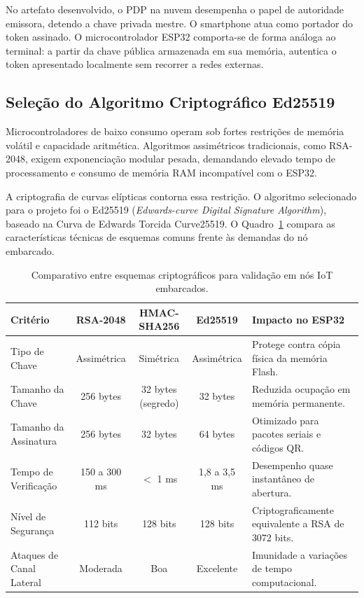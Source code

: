 No artefato desenvolvido, o PDP na nuvem desempenha o papel de autoridade emissora, detendo a chave privada mestre. O smartphone atua como portador do token assinado. O microcontrolador ESP32 comporta-se de forma análoga ao terminal: a partir da chave pública armazenada em sua memória, autentica o token apresentado localmente sem recorrer a redes externas.

\subsection{Seleção do Algoritmo Criptográfico Ed25519}
\label{subsec:escolha-ed25519}

Microcontroladores de baixo consumo operam sob fortes restrições de memória volátil e capacidade aritmética. Algoritmos assimétricos tradicionais, como RSA-2048, exigem exponenciação modular pesada, demandando elevado tempo de processamento e consumo de memória RAM incompatível com o ESP32.

A criptografia de curvas elípticas contorna essa restrição. O algoritmo selecionado para o projeto foi o Ed25519 (\textit{Edwards-curve Digital Signature Algorithm}), baseado na Curva de Edwards Torcida Curve25519. O Quadro~\ref{quadro:comparativo-cripto} compara as características técnicas de esquemas comuns frente às demandas do nó embarcado.

\begin{table}[htbp]
\centering
\footnotesize
\caption{Comparativo entre esquemas criptográficos para validação em nós IoT embarcados.}
\label{quadro:comparativo-cripto}
\begin{tabularx}{\textwidth}{p{3.2cm} ccc X}
\toprule
\textbf{Critério} & \textbf{RSA-2048} & \textbf{HMAC-SHA256} & \textbf{Ed25519} & \textbf{Impacto no ESP32} \\
\midrule
Tipo de Chave & Assimétrica & Simétrica & Assimétrica & Protege contra cópia física da memória Flash. \\
Tamanho da Chave & 256 bytes & 32 bytes (segredo) & 32 bytes & Reduzida ocupação em memória permanente. \\
Tamanho da Assinatura & 256 bytes & 32 bytes & 64 bytes & Otimizado para pacotes seriais e códigos QR. \\
Tempo de Verificação & 150 a 300 ms & $<$ 1 ms & 1,8 a 3,5 ms & Desempenho quase instantâneo de abertura. \\
Nível de Segurança & 112 bits & 128 bits & 128 bits & Criptograficamente equivalente a RSA de 3072 bits. \\
Ataques de Canal Lateral & Moderada & Boa & Excelente & Imunidade a variações de tempo computacional. \\
\bottomrule
\end{tabularx}
\end{table}

